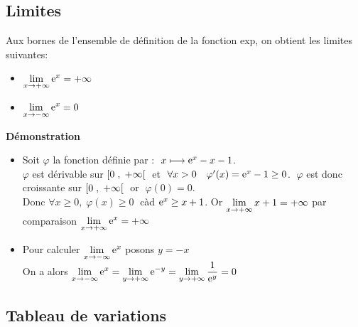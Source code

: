\subsection*{Limites} 
Aux bornes de l'ensemble de définition de la fonction exp, on obtient les limites suivantes:
\begin{property}
\begin{itemize}
\item  $\displaystyle \lim_{x \to +\infty}\mathrm{e}^{x} =+\infty $ 
 \item $ \displaystyle\lim_{x \to -\infty}\mathrm{e}^{ x}=0 $
\end{itemize}
\end{property}

\textbf{Démonstration}
\begin{itemize}
\item  Soit $ \varphi $  la fonction définie par : $\; x\longmapsto \mathrm{e}^{x}-x-1 $. \\
$ \varphi $  est dérivable sur $ \left[0 \;,\; +\infty\right[ \;$    et  $ \;\forall x> 0 \quad  \varphi^{\prime}(x)= \mathrm{e}^{x}-1\geq 0$.  $ \;\varphi $  est donc croissante sur  $ \left[0 \;,\; +\infty\right[ \;$    or  $ \;\varphi(0)=0. $  \\ Donc $ \forall x \geq 0,\; \varphi(x)\geq 0 \;$  càd  $ \mathrm{e}^{x}\geq x+1 $.  Or $ \displaystyle\lim_{x \to +\infty}x+1=+\infty $  
par comparaison  $ \displaystyle\lim_{x \to +\infty}\mathrm{e}^{x} =+\infty $ \\
\item Pour calculer $ \displaystyle\lim_{x \to -\infty}\mathrm{e}^{ x} $\;  posons\; $ y=-x $   \\
On a alors \;$\displaystyle\lim_{x \to -\infty}\mathrm{e}^{ x} = \displaystyle\lim_{y \to +\infty}\mathrm{e}^{-y}=\lim_{y \to +\infty}\dfrac{1}{\mathrm{e}^{y}}=0 $

\end{itemize}
\subsection*{ Tableau de variations}
\begin{center}


\end{center}

